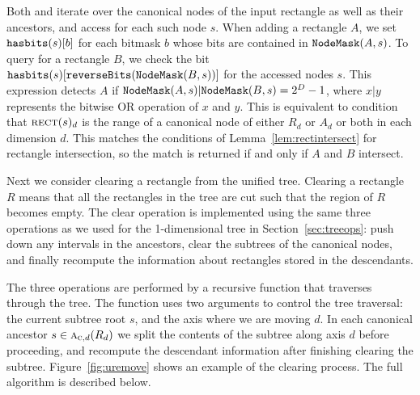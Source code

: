 \documentclass[english,gradu]{tktltiki2018}
\begin{document}
Both \adddt and \checkdt iterate over the canonical nodes of the input rectangle as well as their ancestors, and access  for each such node $s$.
When adding a rectangle $A$, we set $\hasbits{s}{b}$ for each bitmask $b$ whose bits are contained in $\maskof{A,s}$.
To query for a rectangle $B$, we check the bit $\hasbits{s}{\texttt{reverseBits}(\maskof{B,s})}$ for the accessed nodes $s$.
This expression detects $A$ if $\maskof{A,s}|\maskof{B,s}=2^D-1$, where $x|y$ represents the bitwise OR operation of $x$ and $y$.
This is equivalent to condition that $\rect{s}_d$ is the range of a canonical node of either $R_d$ or $A_d$ or both in each dimension $d$.
This matches the conditions of Lemma~\ref{lem:rectintersect} for rectangle intersection, so the match is returned if and only if $A$ and $B$ intersect.

Next we consider clearing a rectangle from the unified tree.
Clearing a rectangle $R$ means that all the rectangles in the tree are cut such that the region of $R$ becomes empty.
The clear operation is implemented using the same three operations as we used for the 1-dimensional tree in Section~\ref{sec:treeops}:
push down any intervals in the ancestors, clear the subtrees of the canonical nodes, and finally recompute the information about rectangles stored in the descendants.

The three operations are performed by a recursive function \cleardt that traverses through the tree.
The function uses two arguments to control the tree traversal: the current subtree root $s$, and the axis where we are moving $d$.
In each canonical ancestor $s\in\canonpari{R_d}{d}$ we split the contents of the subtree along axis $d$ before proceeding, and recompute the descendant information after finishing clearing the subtree.
Figure~\ref{fig:uremove} shows an example of the clearing process.
The full algorithm is described below.
\end{document}
